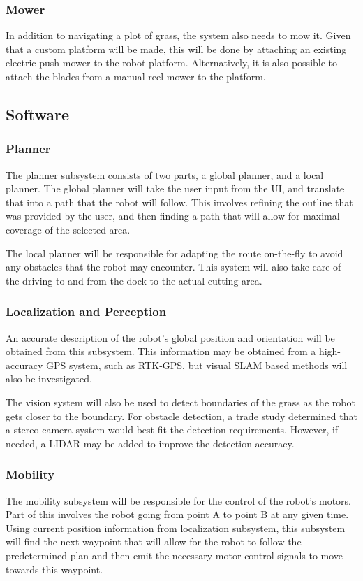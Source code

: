 \documentclass[12pt]{extarticle}
\begin{document}
		\subsubsection{Mower}
			In addition to navigating a plot of grass, the system also needs to mow it. Given that a custom platform will be made, this will be done by attaching an existing electric push mower to the robot platform. Alternatively, it is also possible to attach the blades from a manual reel mower to the platform. 
	
	\subsection{Software}
		\subsubsection{Planner}
			The planner subsystem consists of two parts, a global planner, and  a local planner. The global planner will take the user input from the UI, and translate that into a path that the robot will follow. This involves refining the outline that was provided by the user, and then finding a path that will allow for maximal coverage of the selected area. 
			
			The local planner will be responsible for adapting the route on-the-fly to avoid any obstacles that the robot may encounter. This system will also take care of the driving to and from the dock to the actual cutting area. 
			
		\subsubsection{Localization and Perception}
			An accurate description of the robot's global position and orientation will be obtained from this subsystem. This information may be obtained from a high-accuracy GPS system, such as RTK-GPS, but visual SLAM based methods will also be investigated. 
			
			The vision system will also be used to detect boundaries of the grass as the robot gets closer to the boundary. For obstacle detection, a trade study determined that a stereo camera system would best fit the detection requirements. However, if needed, a LIDAR may be added to improve the detection accuracy. 
		
		\subsubsection{Mobility}
			The mobility subsystem will be responsible for the control of the robot's motors. Part of this involves the robot going from point A to point B at any given time. Using current position information from localization subsystem, this subsystem will find the next waypoint that will allow for the robot to follow the predetermined plan and then emit the necessary motor control signals to move towards this waypoint. 
			
\end{document}
